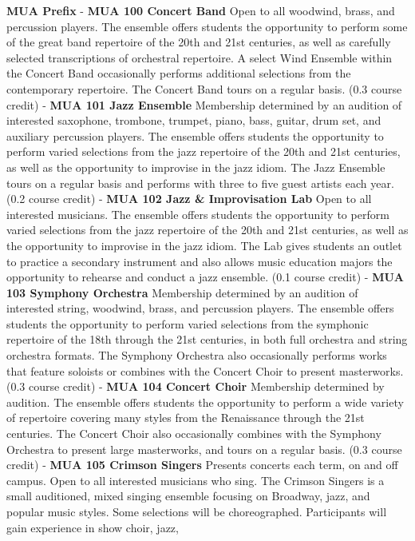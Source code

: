 \documentclass[
  letterpaper,
]{scrbook}
\begin{document}
\textbf{MUA Prefix} - \textbf{MUA 100 Concert Band} Open to all
woodwind, brass, and percussion players. The ensemble offers students
the opportunity to perform some of the great band repertoire of the 20th
and 21st centuries, as well as carefully selected transcriptions of
orchestral repertoire. A select Wind Ensemble within the Concert Band
occasionally performs additional selections from the contemporary
repertoire. The Concert Band tours on a regular basis. (0.3 course
credit) - \textbf{MUA 101 Jazz Ensemble} Membership determined by an
audition of interested saxophone, trombone, trumpet, piano, bass,
guitar, drum set, and auxiliary percussion players. The ensemble offers
students the opportunity to perform varied selections from the jazz
repertoire of the 20th and 21st centuries, as well as the opportunity to
improvise in the jazz idiom. The Jazz Ensemble tours on a regular basis
and performs with three to five guest artists each year. (0.2 course
credit) - \textbf{MUA 102 Jazz \& Improvisation Lab} Open to all
interested musicians. The ensemble offers students the opportunity to
perform varied selections from the jazz repertoire of the 20th and 21st
centuries, as well as the opportunity to improvise in the jazz idiom.
The Lab gives students an outlet to practice a secondary instrument and
also allows music education majors the opportunity to rehearse and
conduct a jazz ensemble. (0.1 course credit) - \textbf{MUA 103 Symphony
Orchestra} Membership determined by an audition of interested string,
woodwind, brass, and percussion players. The ensemble offers students
the opportunity to perform varied selections from the symphonic
repertoire of the 18th through the 21st centuries, in both full
orchestra and string orchestra formats. The Symphony Orchestra also
occasionally performs works that feature soloists or combines with the
Concert Choir to present masterworks. (0.3 course credit) - \textbf{MUA
104 Concert Choir} Membership determined by audition. The ensemble
offers students the opportunity to perform a wide variety of repertoire
covering many styles from the Renaissance through the 21st centuries.
The Concert Choir also occasionally combines with the Symphony Orchestra
to present large masterworks, and tours on a regular basis. (0.3 course
credit) - \textbf{MUA 105 Crimson Singers} Presents concerts each term,
on and off campus. Open to all interested musicians who sing. The
Crimson Singers is a small auditioned, mixed singing ensemble focusing
on Broadway, jazz, and popular music styles. Some selections will be
choreographed. Participants will gain experience in show choir, jazz,
\end{document}
